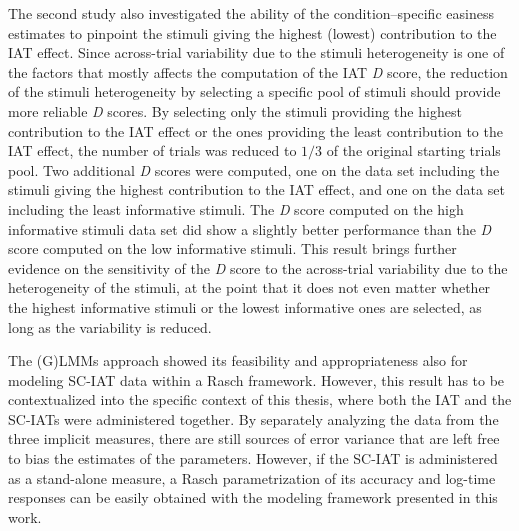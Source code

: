 \documentclass[12pt]{book}
\begin{document}
The second study also investigated the ability of the condition--specific easiness estimates to pinpoint the stimuli giving the highest (lowest) contribution to the IAT effect. 
Since across-trial variability due to the stimuli heterogeneity is one of the factors that mostly affects the computation of the IAT \emph{D} score, the reduction of the stimuli heterogeneity by selecting a specific pool of stimuli should provide more reliable \emph{D} scores.
  By selecting only the stimuli providing the highest contribution to the IAT effect or the ones providing the least contribution to the IAT effect, the number of trials was reduced to $1/3$ of the original starting trials pool. 
Two additional \emph{D} scores were computed, one on the data set including the stimuli giving the highest contribution to the IAT effect, and one on the data set including the least informative stimuli. 
The \emph{D} score computed on the high informative stimuli data set did show a slightly better performance than the \emph{D} score computed on the low informative stimuli. 
This result brings further evidence on the sensitivity of the \emph{D} score to the across-trial variability due to the heterogeneity of the stimuli, at the point that it does not even matter whether the highest informative stimuli or the lowest informative ones are selected, as long as the variability is reduced. 

The (G)LMMs approach showed its feasibility and appropriateness also for modeling SC-IAT data within a Rasch framework.
However, this result has to be contextualized into the specific context of this thesis, where both the IAT and the SC-IATs were administered together. 
By separately analyzing the data from the three implicit measures, there are still sources of error variance that are left free to bias the  estimates of the parameters. 
However, if the SC-IAT is administered as a stand-alone measure, a Rasch parametrization of its accuracy and log-time responses can be easily obtained with the modeling framework presented in this work. 
\end{document}
